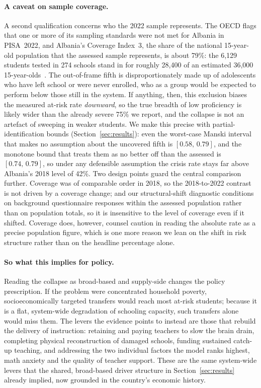 \paragraph{A caveat on sample coverage.}
A second qualification concerns who the 2022 sample represents. The OECD flags that one
or more of its sampling standards were not met for Albania in PISA~2022, and Albania's
Coverage Index~3, the share of the national 15-year-old population that the assessed
sample represents, is about 79\%: the 6{,}129 students tested in 274 schools stand in
for roughly 28{,}400 of an estimated 36{,}000
15-year-olds~\citep{oecd2024pisa,oecd_albania_note2023}. The out-of-frame fifth is
disproportionately made up of adolescents who have left school or were never enrolled,
who as a group would be expected to perform below those still in the system. If
anything, then, this exclusion biases the measured at-risk rate \emph{downward}, so the
true breadth of low proficiency is likely wider than the already severe 75\% we report,
and the collapse is not an artefact of sweeping in weaker students. We make this precise
with partial-identification bounds (Section~\ref{sec:results}): even the worst-case
Manski interval that makes no assumption about the uncovered fifth is
$[0.58,\,0.79]$, and the monotone bound that treats them as no better off than the
assessed is $[0.74,\,0.79]$, so under any defensible assumption the crisis rate stays
far above Albania's 2018 level of 42\%. Two design points
guard the central comparison further. Coverage was of comparable order in 2018, so the
2018-to-2022 contrast is not driven by a coverage change; and our structural-shift
diagnostic conditions on background questionnaire responses within the assessed
population rather than on population totals, so it is insensitive to the level of
coverage even if it shifted. Coverage does, however, counsel caution in reading the
absolute rate as a precise population figure, which is one more reason we lean on the
shift in risk structure rather than on the headline percentage alone.

\paragraph{So what this implies for policy.}
Reading the collapse as broad-based and supply-side changes the policy prescription. If
the problem were concentrated household poverty, socioeconomically targeted transfers
would reach most at-risk students; because it is a flat, system-wide degradation of
schooling capacity, such transfers alone would miss them. The levers the evidence points
to instead are those that rebuild the delivery of instruction: retaining and paying
teachers to slow the brain drain, completing physical reconstruction of damaged schools,
funding sustained catch-up teaching, and addressing the two individual factors the model
ranks highest, math anxiety and the quality of teacher support. These are the same
system-wide levers that the shared, broad-based driver structure in
Section~\ref{sec:results} already implied, now grounded in the country's economic
history.

